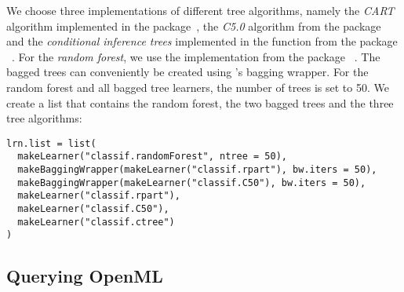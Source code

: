 We choose three implementations of different tree
algorithms, namely the \textit{CART} algorithm implemented in the
 package~\citep{rpart}, the \textit{C5.0} algorithm from the package
~\citep{C50} and the \textit{conditional inference trees} implemented
in the  function from the package ~\citep{party}.
For the \textit{random forest}, we use the implementation from the package
~\citep{randomForest}.
The bagged trees can conveniently be created using 's bagging wrapper.
For the random forest and all bagged tree learners, the number of trees is set to 50.
We create a list that contains the random forest, the two bagged trees and the three tree algorithms:

\begin{knitrout}\small
{}\color{fgcolor}\begin{kframe}
\begin{verbatim}
lrn.list = list(
  makeLearner("classif.randomForest", ntree = 50),
  makeBaggingWrapper(makeLearner("classif.rpart"), bw.iters = 50),
  makeBaggingWrapper(makeLearner("classif.C50"), bw.iters = 50),
  makeLearner("classif.rpart"),
  makeLearner("classif.C50"),
  makeLearner("classif.ctree")
)
\end{verbatim}
\end{kframe}
\end{knitrout}

\subsection{Querying OpenML}

